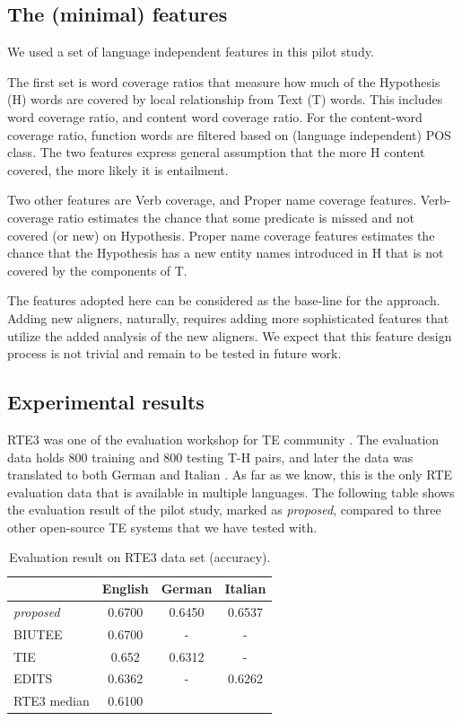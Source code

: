 \documentclass[11pt,letterpaper]{article}
\begin{document}
\subsection{The (minimal) features} 
We used a set of language independent features in this pilot study. 

The first set is word coverage ratios that measure how much of the
Hypothesis (H) words are covered by local relationship from Text (T)
words. This includes word coverage ratio, and content word  coverage
ratio. For the content-word coverage ratio, function words are
filtered based on (language independent) POS class. The two features
express general assumption that the more H content covered, the more
likely it is entailment.    

Two other features are Verb coverage, and Proper name
coverage features. Verb-coverage ratio estimates the chance that some
predicate is missed and not covered (or new) on Hypothesis.
Proper name coverage features estimates the chance that the Hypothesis
has a new entity names introduced in H that is not covered by the
components of T. 

The features adopted here can be considered as the base-line for the
approach. Adding new aligners, naturally, requires adding more
sophisticated features that utilize the added analysis of the new
aligners. We expect that this feature design process is not trivial
and remain to be tested in future work.  

\subsection{Experimental results} 
RTE3 was one of the evaluation workshop for TE community \cite{}. The
evaluation data holds 800 training and 800 testing T-H pairs, and
later the data was translated to both German and Italian \cite{}. As
far as we know, this is the only RTE evaluation data that is available
in multiple languages. The following table shows the evaluation result
of the pilot study, marked as {\em proposed}, compared to three other 
open-source TE systems that we have tested with.  

\begin{table}[t!]
\centering
\small
\begin{tabular}{l|ccc}
          &   English   &   German   &   Italian \\
\hline
{\em proposed}&   0.6700      &   0.6450    &  0.6537  \\
BIUTEE        &   0.6700      &     -       &     -    \\
TIE           &   0.652       &   0.6312    &     -    \\ 
EDITS         &   0.6362      &     -       &  0.6262  \\
RTE3 median   &   0.6100      &             &          \\

\end{tabular}
\caption{Evaluation result on RTE3 data set (accuracy).}
\label{table:rte3}
\end{table}
\end{document}
